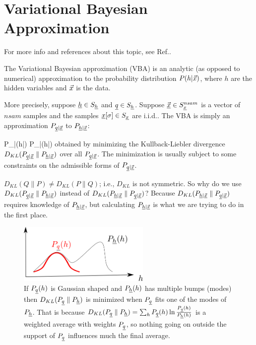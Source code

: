 \chapter{Variational Bayesian Approximation}

For more info and references about
this topic, see Ref.\cite{wiki-var-bay}.

The Variational Bayesian approximation (VBA)
is an analytic 
(as opposed to numerical) approximation
to the probability 
distribution $P(h|{\vec{x}})$,
where $h$ are the hidden variables 
and ${\vec{x}}$ is the data. 


More precisely, suppose ${\underline{h}}\in S_{\underline{h}}$ and ${\underline{q}}\in S_{\underline{h}}$.
Suppose $\vec{{\underline{x}}}\in S_{\underline{x}}^{nsam}$
 is a vector of $nsam$ samples
and the samples ${\underline{x}}[\sigma]\in S_{\underline{x}}$ are i.i.d..
 The VBA is simply 
an approximation
$P_{{\underline{q}}|\vec{{\underline{x}}}}$ to
$P_{{\underline{h}}|\vec{{\underline{x}}}}$:


\beq
P_{\rvh|\vec{\rvx}}(h|\vecx)
\approx P_{\rvq|\vec{\rvx}}(h|\vecx)
\eeq
obtained by minimizing the Kullback-Liebler divergence
$D_{KL}(P_{{\underline{q}}|\vec{{\underline{x}}}}\parallel
P_{{\underline{h}}|\vec{{\underline{x}}}})$
over all 
$P_{{\underline{q}}|\vec{{\underline{x}}}}$. The minimization
is 
usually subject to some constraints
on the admissible forms of 
$P_{{\underline{q}}|\vec{{\underline{x}}}}$.


$D_{KL}(Q\parallel P)\neq
D_{KL}(P\parallel Q)$; i.e.,  $D_{KL}$ is not
symmetric. So why do we use 
$D_{KL}(P_{{\underline{q}}|\vec{{\underline{x}}}}\parallel
P_{{\underline{h}}|\vec{{\underline{x}}}})$
instead of 
$D_{KL}(
P_{{\underline{h}}|\vec{{\underline{x}}}}\parallel P_{{\underline{q}}|\vec{{\underline{x}}}})$?
Because 
$D_{KL}(
P_{{\underline{h}}|\vec{{\underline{x}}}}\parallel P_{{\underline{q}}|\vec{{\underline{x}}}})$
requires knowledge of $P_{{\underline{h}}|\vec{{\underline{x}}}}$,
but calculating $P_{{\underline{h}}|\vec{{\underline{x}}}}$
is what we are trying to do in the first place.

\begin{figure}[h!]
\centering
\includegraphics[width=2.5in]
{var-bay/kl-q-support.png}
\caption{
If $P_{\underline{q}}(h)$
is Gaussian shaped 
and $P_{\underline{h}}(h)$
has multiple
bumps (modes)
then 
$D_{KL}(P_{\underline{q}}\parallel P_{\underline{h}})$
is minimized when $P_{\underline{q}}$
fits one of the modes of $P_{\underline{h}}$.
That is because $D_{KL}(P_{\underline{q}}\parallel P_{\underline{h}})=
\sum_h P_{\underline{q}}(h)\ln \frac{P_{\underline{q}}(h)}{P_{\underline{h}}(h)}$
is a weighted average with weights $P_{\underline{q}}$,
so nothing going on outside the support
of $P_{\underline{q}}$ influences  much
the final average.
}
\label{fig-kl-q-support}
\end{figure}


